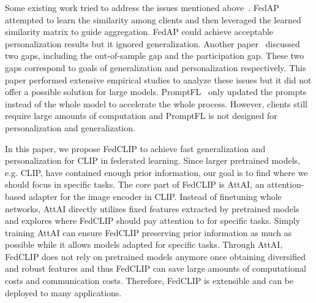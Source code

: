 \documentclass[11pt]{article}
\newcommand{\method}{FedCLIP\xspace}
\newcommand{\mecom}{AttAI\xspace}
\newcommand{\wjdd}[1]{\todo[linecolor=cyan,backgroundcolor=cyan!25,bordercolor=cyan,size=\scriptsize]{(WJD): #1}}
\begin{document}

Some existing work tried to address the issues mentioned above~\cite{lu2022personalized, Honglinyuan2022, guo2022promptfl}.
FedAP~\cite{lu2022personalized} attempted to learn the similarity among clients and then leveraged the learned similarity matrix to guide aggregation.
FedAP could achieve acceptable personalization results but it ignored generalization.
Another paper~\cite{Honglinyuan2022} discussed two gaps, including the out-of-sample gap and the participation gap.
These two gaps correspond to goals of generalization and personalization respectively.
This paper performed extensive empirical studies to analyze these issues but it did not offer a possible solution for large models.
PromptFL~\cite{guo2022promptfl} only updated the prompts instead of the whole model to accelerate the whole process.
However, clients still require large amounts of computation and PromptFL is not designed for personalization and generalization.

In this paper, we propose \method to achieve fast generalization and personalization for CLIP in federated learning.
Since larger pretrained models, e.g. CLIP, have contained enough prior information, our goal is to find where we should focus in specific tasks.
The core part of \method is \mecom, an attention-based adapter for the image encoder in CLIP.
Instead of finetuning whole networks, \mecom directly utilizes fixed features extracted by pretrained models and explores where \method should pay attention to for specific tasks.
Simply training \mecom can ensure \method preserving prior information as much as possible while it allows models adapted for specific tasks.
Through \mecom, \method does not rely on pretrained models anymore once obtaining diversified and robust features and thus \method can save large amounts of computational costs and communication costs.
Therefore, \method is extensible and can be deployed to many applications.

\end{document}
